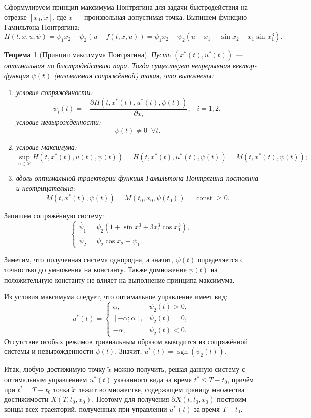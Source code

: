 \documentclass[11pt]{article}
\newtheorem{theorem}{Теорема}
\newcommand{\const}{\ensuremath{\operatorname{const}}}
\newcommand{\sgn}{\ensuremath{\operatorname{sgn}}}
\begin{document}
Сформулируем принцип максимума Понтрягина для задачи быстродействия на отрезке $[x_0, \tilde{x}]$, где $\tilde{x}$ --- произвольная допустимая точка. Выпишем функцию Гамильтона-Понтрягина:
$$
H(t, x, u, \psi) = \psi_1 x_2 + \psi_2(u - f(t, x, u)) = \psi_1 x_2 + \psi_2(u - x_1 - \sin x_2 - x_1 \sin x_1^3).
$$
\begin{theorem}[Принцип максимума Понтрягина]
Пусть $\left( x^*(t), u^*(t) \right)$ --- оптимальная по быстродействию пара. Тогда существует непрерывная вектор-функция $\psi(t)$ (называемая сопряжённой) такая, что выполнены:
\begin{enumerate}
\item
условие сопряжённости:
$$
\dot{\psi_i}(t) = -\frac{\partial H(t, x^*(t), u^*(t), \psi(t))}{\partial x_i}, \; \; \; i = 1, 2,
$$
условие невырожденности:
$$
\psi(t) \neq 0 \; \; \forall t.
$$
\item
условие максимума:
$$
\sup \limits_{u \in \mathcal{P}} H(t, x^*(t), u(t), \psi(t)) = H(t, x^*(t), u^*(t), \psi(t)) = M(t, x^*(t), \psi(t));
$$
\item
вдоль оптимальной траектории функция Гамильтона-Понтрягина постоянна и неотрицательна:
$$
M(t, x^*(t), \psi(t)) = M(t_0, x_0, \psi(t_0)) = \const \geqslant 0.
$$
\end{enumerate}
\end{theorem}

Запишем сопряжённую систему:
$$
\left\{
\begin{aligned}
\dot{\psi_1} = \psi_2(1 + \sin x_1^3 + 3 x_1^3 \cos x_1^3), \\
\dot{\psi_2} = \psi_2 \cos x_2 - \psi_1.
\end{aligned}
\right.
$$

Заметим, что полученная система однородна, а значит, $\psi(t)$ определяется с точностью до умножения на константу. Также домножение $\psi(t)$ на положительную константу не влияет на выполнение принципа максимума.

Из условия максимума следует, что оптимальное управление имеет вид:
$$
u^*(t) = \begin{cases}
\alpha, & \psi_2(t) > 0, \\
[-\alpha; \alpha], & \psi_2(t) = 0, \\
-\alpha, & \psi_2(t) < 0.
\end{cases}
$$
Отсутствие особых режимов тривиальным образом выводится из сопряжённой системы и невырожденности $\psi(t)$. Значит, $u^*(t) = \sgn(\psi_2(t))$.

Итак, любую достижимую точку $\tilde{x}$ можно получить, решая данную систему с оптимальным управлением $u^*(t)$ указанного вида за время $t^* \leqslant T - t_0$, причём при $t^* = T - t_0$ точка $\tilde{x}$ лежит во множестве, содержащем границу множества достижимости $X(T, t_0, x_0)$. Поэтому для получения $\partial X(t, t_0, x_0)$ построим концы всех траекторий, полученных при управлении $u^*(t)$ за время $T - t_0$.
\end{document}
